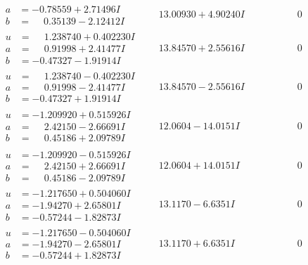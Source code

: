\documentclass[1p]{elsarticle_modified}
\theoremstyle{definition}
\begin{document}
$$\begin{array}{c|c|c}
\begin{aligned}
a &= -0.78559 + 2.71496 I \\
b &= \phantom{-}0.35139 - 2.12412 I\end{aligned}
 & \phantom{-}13.00930 + 4.90240 I & \phantom{-0.000000 } 0 \\ \hline\begin{aligned}
u &= \phantom{-}1.238740 + 0.402230 I \\
a &= \phantom{-}0.91998 + 2.41477 I \\
b &= -0.47327 - 1.91914 I\end{aligned}
 & \phantom{-}13.84570 + 2.55616 I & \phantom{-0.000000 } 0 \\ \hline\begin{aligned}
u &= \phantom{-}1.238740 - 0.402230 I \\
a &= \phantom{-}0.91998 - 2.41477 I \\
b &= -0.47327 + 1.91914 I\end{aligned}
 & \phantom{-}13.84570 - 2.55616 I & \phantom{-0.000000 } 0 \\ \hline\begin{aligned}
u &= -1.209920 + 0.515926 I \\
a &= \phantom{-}2.42150 - 2.66691 I \\
b &= \phantom{-}0.45186 + 2.09789 I\end{aligned}
 & \phantom{-}12.0604 - 14.0151 I & \phantom{-0.000000 } 0 \\ \hline\begin{aligned}
u &= -1.209920 - 0.515926 I \\
a &= \phantom{-}2.42150 + 2.66691 I \\
b &= \phantom{-}0.45186 - 2.09789 I\end{aligned}
 & \phantom{-}12.0604 + 14.0151 I & \phantom{-0.000000 } 0 \\ \hline\begin{aligned}
u &= -1.217650 + 0.504060 I \\
a &= -1.94270 + 2.65801 I \\
b &= -0.57244 - 1.82873 I\end{aligned}
 & \phantom{-}13.1170 - 6.6351 I & \phantom{-0.000000 } 0 \\ \hline\begin{aligned}
u &= -1.217650 - 0.504060 I \\
a &= -1.94270 - 2.65801 I \\
b &= -0.57244 + 1.82873 I\end{aligned}
 & \phantom{-}13.1170 + 6.6351 I & \phantom{-0.000000 } 0\\

\end{array}$$
\end{document}
